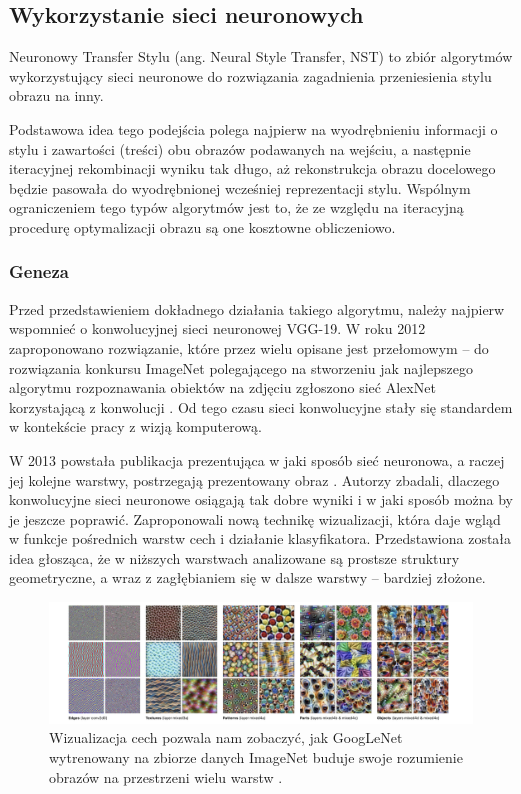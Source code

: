 \documentclass[12pt]{article}
\begin{document}
\subsection{Wykorzystanie sieci neuronowych}

\indent

Neuronowy Transfer Stylu (ang. Neural Style Transfer, NST) to zbiór algorytmów wykorzystujący sieci neuronowe do rozwiązania zagadnienia przeniesienia stylu obrazu na inny.

Podstawowa idea tego podejścia polega najpierw na wyodrębnieniu informacji o stylu i zawartości (treści) obu obrazów podawanych na wejściu, a następnie iteracyjnej rekombinacji wyniku tak długo, aż rekonstrukcja obrazu docelowego będzie pasowała do wyodrębnionej wcześniej reprezentacji stylu. Wspólnym ograniczeniem tego typów algorytmów jest to, że ze względu na iteracyjną procedurę optymalizacji obrazu są one kosztowne obliczeniowo.

\subsubsection{Geneza}

\indent

Przed przedstawieniem dokładnego działania takiego algorytmu, należy najpierw wspomnieć o konwolucyjnej sieci neuronowej VGG-19. W roku 2012 zaproponowano rozwiązanie, które przez wielu opisane jest przełomowym – do rozwiązania konkursu ImageNet polegającego na stworzeniu jak najlepszego algorytmu rozpoznawania obiektów na zdjęciu zgłoszono sieć AlexNet korzystającą z konwolucji \cite{32}. Od tego czasu sieci konwolucyjne stały się standardem w kontekście pracy z wizją komputerową.

W 2013 powstała publikacja prezentująca w jaki sposób sieć neuronowa, a raczej jej kolejne warstwy, postrzegają prezentowany obraz \cite{33}. Autorzy zbadali, dlaczego konwolucyjne sieci neuronowe osiągają tak dobre wyniki i w jaki sposób można by je jeszcze poprawić. Zaproponowali nową technikę wizualizacji, która daje wgląd w funkcje pośrednich warstw cech i działanie klasyfikatora. Przedstawiona została idea głosząca, że w niższych warstwach analizowane są prostsze struktury geometryczne, a wraz z zagłębianiem się w dalsze warstwy – bardziej złożone.
\begin{figure}[H]
    \centering
    \includegraphics[width=\textwidth]{u7.png}
    \caption{Wizualizacja cech pozwala nam zobaczyć, jak GoogLeNet wytrenowany na zbiorze danych ImageNet buduje swoje rozumienie obrazów na przestrzeni wielu warstw \cite{61}.}
    \label{fig:4}
\end{figure}
\end{document}
